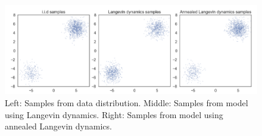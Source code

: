 \documentclass[twoside]{article}
\numberwithin{equation}{section}
\numberwithin{figure}{section}
\begin{document}
\begin{figure}[h]
  \begin{center}
    \includegraphics[width=\textwidth]{images/langevin_samples.png}
    \caption{Left: Samples from data distribution. Middle: Samples from model using Langevin dynamics. Right: Samples from model using annealed Langevin dynamics. \cite{song2020generative}}
    \label{fig:langevin_samples}
  \end{center}
\end{figure}
\end{document}
